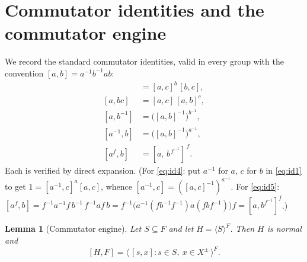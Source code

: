 \documentclass{amsart}
\newtheorem{lemma}{Lemma}
\theoremstyle{definition}
\theoremstyle{remark}
\begin{document}
\section{Commutator identities and the commutator engine}\label{sec:engine}

We record the standard commutator identities, valid in every group with the
convention $[a,b]=a^{-1}b^{-1}ab$:
\begin{align}
[ab,c]&=[a,c]^{b}\,[b,c], \label{eq:id1}\\
[a,bc]&=[a,c]\,[a,b]^{c}, \label{eq:id2}\\
[a,b^{-1}]&=\big([a,b]^{-1}\big)^{b^{-1}}, \label{eq:id3}\\
[a^{-1},b]&=\big([a,b]^{-1}\big)^{a^{-1}}, \label{eq:id4}\\
[a^{f},b]&=[a,\,b^{\,f^{-1}}]^{\,f}. \label{eq:id5}
\end{align}
Each is verified by direct expansion. (For \eqref{eq:id4}: put $a^{-1}$ for $a$,
$c$ for $b$ in \eqref{eq:id1} to get $1=[a^{-1},c]^{a}[a,c]$, whence
$[a^{-1},c]=([a,c]^{-1})^{a^{-1}}$. For \eqref{eq:id5}:
$[a^f,b]=f^{-1}a^{-1}f\,b^{-1}\,f^{-1}af\,b
=f^{-1}\big(a^{-1}(fb^{-1}f^{-1})a(fbf^{-1})\big)f=[a,b^{f^{-1}}]^{f}$.)

\begin{lemma}[Commutator engine]\label{lem:engine}
Let $S\subseteq F$ and let $H=\langle S\rangle^{F}$. Then $H$ is normal and
\begin{equation}\label{eq:engine}
[H,F]=\big\langle\,[s,x] : s\in S,\ x\in X^{\pm}\,\big\rangle^{F}.
\end{equation}
\end{lemma}
\end{document}
